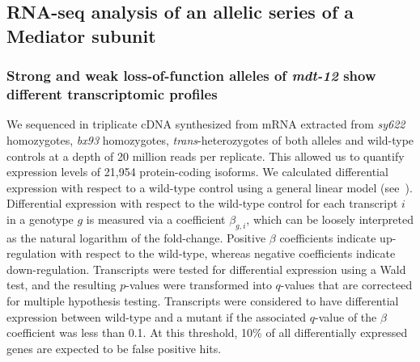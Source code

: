 \documentclass[10pt, twocolumn]{article}
\newcommand{\gene}[1]{\mbox{\emph{#1}}}
\begin{document}

\subsection*{RNA-seq analysis of an allelic series of a Mediator subunit}
\subsubsection*{Strong and weak loss-of-function alleles of \gene{mdt-12} show
             different transcriptomic profiles}
We sequenced in triplicate cDNA synthesized from mRNA extracted from
\emph{sy622} homozygotes, \emph{bx93} homozygotes,
\emph{trans}-heterozygotes of both alleles and wild-type controls at a depth of
20 million reads per replicate. This allowed us to quantify expression levels of
21,954 protein-coding isoforms. We calculated differential expression with
respect to a wild-type control using a general linear model
(see~). Differential expression with respect to the
wild-type control for each transcript $i$ in a genotype $g$ is measured via a
coefficient $\beta_{g, i}$, which can be loosely interpreted as the natural
logarithm of the fold-change. Positive $\beta$ coefficients indicate
up-regulation with respect to the wild-type, whereas negative coefficients
indicate down-regulation. Transcripts were tested for differential expression
using a Wald test, and the resulting $p$-values were transformed into $q$-values
that are correcteed for multiple hypothesis testing. Transcripts were considered
to have differential expression between wild-type and a mutant if the associated
$q$-value of the $\beta$ coefficient was less than 0.1. At this threshold, 10\%
of all differentially expressed genes are expected to be false positive hits.
\end{document}
